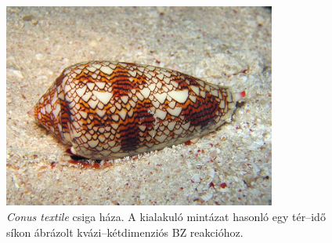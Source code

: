 \begin{figure}[h]
\centering
\includegraphics[width=0.8\textwidth]{img/conus.jpg}
\caption{\emph{Conus textile} csiga háza. A kialakuló mintázat hasonló egy tér--idő síkon ábrázolt kvázi--kétdimenziós BZ reakcióhoz.}
\label{fig:csiga}
\end{figure}

